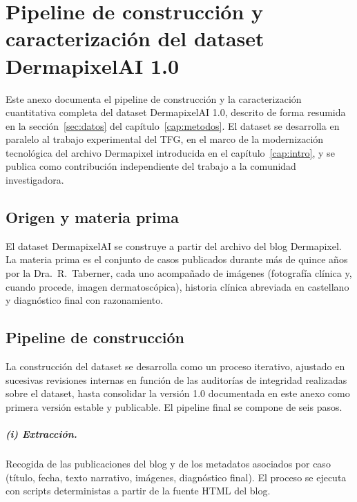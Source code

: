 
\chapter{Pipeline de construcción y caracterización del dataset DermapixelAI 1.0}
\label{anexo:pipeline}
\label{cap:anexoc}

Este anexo documenta el pipeline de construcción y la caracterización
cuantitativa completa del dataset DermapixelAI 1.0, descrito de forma
resumida en la sección~\ref{sec:datos} del
capítulo~\ref{cap:metodos}. El dataset se desarrolla en paralelo al
trabajo experimental del TFG, en el marco de la modernización
tecnológica del archivo Dermapixel introducida en el
capítulo~\ref{cap:intro}, y se publica como contribución
independiente del trabajo a la comunidad investigadora.

\section{Origen y materia prima}
\label{sec:anexo-origen}

El dataset DermapixelAI se construye a partir del archivo del blog
Dermapixel. La materia prima es el conjunto de casos publicados
durante más de quince años por la Dra.~R.~Taberner, cada uno
acompañado de imágenes (fotografía clínica y, cuando procede, imagen
dermatoscópica), historia clínica abreviada en castellano y
diagnóstico final con razonamiento.

\section{Pipeline de construcción}
\label{sec:anexo-pipeline}

La construcción del dataset se desarrolla como un proceso iterativo,
ajustado en sucesivas revisiones internas en función de las
auditorías de integridad realizadas sobre el dataset, hasta consolidar
la versión 1.0 documentada en este anexo como primera versión estable
y publicable. El pipeline final se compone de seis pasos.

\paragraph{(i) Extracción.} Recogida de las publicaciones del blog y
de los metadatos asociados por caso (título, fecha, texto narrativo,
imágenes, diagnóstico final). El proceso se ejecuta con scripts
deterministas a partir de la fuente HTML del blog.

